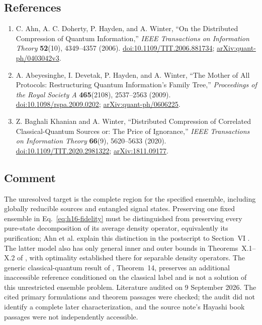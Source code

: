 \subsection*{References}

\begin{enumerate}[label={},leftmargin=4.8em,labelsep=0.5em]
  \footnotesize
  \item[\textup{[ADHW06]}]\label{ref:h16-ahn}
  C. Ahn, A. C. Doherty, P. Hayden, and A. Winter, ``On the Distributed Compression of Quantum Information,'' \emph{IEEE Transactions on Information Theory} \textbf{52}(10), 4349--4357 (2006). \href{https://doi.org/10.1109/TIT.2006.881734}{doi:10.1109/TIT.2006.881734}; \href{https://arxiv.org/abs/quant-ph/0403042v3}{arXiv:quant-ph/0403042v3}.

  \item[\textup{[ADHW09]}]\label{ref:h16-mother}
  A. Abeyesinghe, I. Devetak, P. Hayden, and A. Winter, ``The Mother of All Protocols: Restructuring Quantum Information's Family Tree,'' \emph{Proceedings of the Royal Society A} \textbf{465}(2108), 2537--2563 (2009). \href{https://doi.org/10.1098/rspa.2009.0202}{doi:10.1098/rspa.2009.0202}; \href{https://arxiv.org/abs/quant-ph/0606225}{arXiv:quant-ph/0606225}.

  \item[\textup{[BKW20]}]\label{ref:h16-cq}
  Z. Baghali Khanian and A. Winter, ``Distributed Compression of Correlated Classical-Quantum Sources or: The Price of Ignorance,'' \emph{IEEE Transactions on Information Theory} \textbf{66}(9), 5620--5633 (2020). \href{https://doi.org/10.1109/TIT.2020.2981322}{doi:10.1109/TIT.2020.2981322}; \href{https://arxiv.org/abs/1811.09177}{arXiv:1811.09177}.
\end{enumerate}

\subsection*{Comment}

The unresolved target is the complete region for the specified ensemble, including globally reducible sources and entangled signal states. Preserving one fixed ensemble in Eq.~\eqref{eq:h16-fidelity} must be distinguished from preserving every pure-state decomposition of its average density operator, equivalently its purification; Ahn et al. explain this distinction in the postscript to Section~VI . The latter model also has only general inner and outer bounds in Theorems~X.1--X.2 of , with optimality established there for separable density operators. The generic classical-quantum result of , Theorem~14, preserves an additional inaccessible reference conditioned on the classical label and is not a solution of this unrestricted ensemble problem. Literature audited on 9 September 2026. The cited primary formulations and theorem passages were checked; the audit did not identify a complete later characterization, and the source note's Hayashi book passages were not independently accessible.

